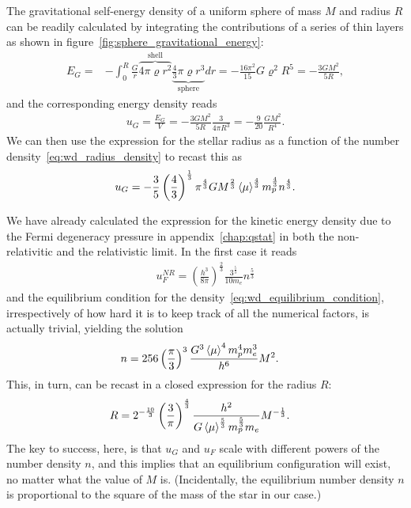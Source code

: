 The gravitational self-energy density of a uniform sphere of mass $M$ and radius
$R$ can be readily calculated by integrating the contributions of a series of
thin layers as shown in figure~\ref{fig:sphere_gravitational_energy}:
\begin{align*}
  E_G = &- \int_0^R \frac{G}{r}
    \overbrace{4\pi \varrho r^2}^\text{shell}
    \underbrace{\frac{4}{3} \pi \varrho r^3}_\text{sphere} dr =
   - \frac{16 \pi^2}{15} G \varrho^2 R^5 = -\frac{3GM^2}{5R},
\end{align*}
and the corresponding energy density reads
\begin{align*}
  u_G = \frac{E_G}{V} =
  -\frac{3GM^2}{5R} \frac{3}{4\pi R^3} = -\frac{9}{20} \frac{GM^2}{R^4}.
\end{align*}
We can then use the expression for the stellar radius as a function of the number
density~\eqref{eq:wd_radius_density} to recast this as
\begin{align}
	u_G = -\frac{3}{5} \left( \frac{4}{3} \right)^\frac{1}{3} \pi^\frac{4}{3} G M^\frac{2}{3}
	\left<\mu\right>^\frac{4}{3} m_p^\frac{4}{3} n^\frac{4}{3}.
\end{align}

We have already calculated the expression for the kinetic energy density due to the
Fermi degeneracy pressure in appendix~\ref{chap:qstat} in both the non-relativitic
and the relativistic limit. In the first case it reads
\begin{align}
  u_F^{NR} = \left( \frac{h^3}{8\pi} \right)^\frac{2}{3}
	\frac{3^\frac{5}{3}}{10 m_e} n^\frac{5}{3}
\end{align}
and the equilibrium condition for the density~\eqref{eq:wd_equilibrium_condition},
irrespectively of how hard it is to keep track of all the numerical factors, is actually
trivial, yielding the solution
\begin{align}\label{eq:wd_n_nr}
  n &= 256 \left( \frac{\pi}{3} \right)^3 \frac{G^3 \left<\mu\right>^4 m_p^4 m_e^3}{h^6} M^2.
\end{align}
This, in turn, can be recast in a closed expression for the radius $R$:
\begin{align}\label{eq:wd_radius_nr}
  R &= 2^{-\frac{10}{3}} \left( \frac{3}{\pi} \right)^\frac{4}{3}
  \frac{h^2}{G \left<\mu\right>^\frac{5}{3} m_p^\frac{5}{3} m_e} M^{-\frac{1}{3}}.
\end{align}
The key to success, here, is that $u_G$ and $u_F$ scale with different powers of the
number density $n$, and this implies that an equilibrium configuration will exist,
no matter what the value of $M$ is. (Incidentally, the equilibrium number density
$n$ is proportional to the square of the mass of the star in our case.)

